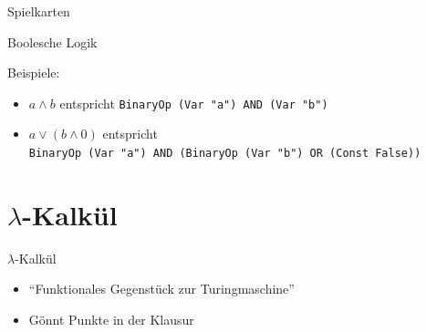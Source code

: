 \documentclass{beamer}
\begin{document}
\begin{frame}{Spielkarten}
\end{frame}

\begin{frame}{Boolesche Logik}

  \vfill

  Beispiele:
  \begin{itemize}
    \item $a \wedge b$ entspricht \texttt{BinaryOp (Var "{}a"{}) AND (Var "{}b"{})}
    \item $a \vee (b \wedge 0)$ entspricht\\
          \texttt{BinaryOp (Var "{}a"{}) AND (BinaryOp (Var "{}b"{}) OR (Const False))}
  \end{itemize}
\end{frame}

\section{$\lambda$-Kalkül}

\begin{frame}{$\lambda$-Kalkül}
	\begin{itemize}
                \item \enquote{Funktionales Gegenstück zur Turingmaschine}
		\item Gönnt Punkte in der Klausur
	\end{itemize}
\end{frame}
\end{document}
